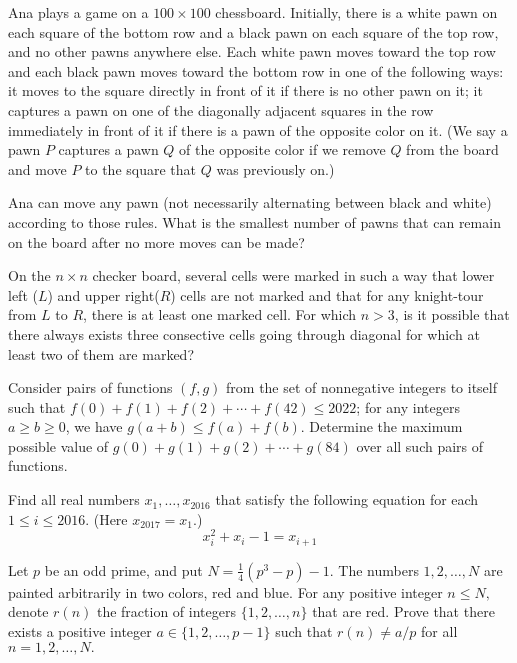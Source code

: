 \documentclass[11pt]{scrartcl}
\begin{document}
\begin{problem}[7205358409203299180]
	Ana plays a game on a $100\times 100$ chessboard. Initially, there is a white pawn on each square of the bottom row and a black pawn on each square of the top row, and no other pawns anywhere else.
Each white pawn moves toward the top row and each black pawn moves toward the bottom row in one of the following ways:
it moves to the square directly in front of it if there is no other pawn on it;
it captures a pawn on one of the diagonally adjacent squares in the row immediately in front of it if there is a pawn of the opposite color on it.
(We say a pawn $P$ captures a pawn $Q$ of the opposite color if we remove $Q$ from the board and move $P$ to the square that $Q$ was previously on.)

Ana can move any pawn (not necessarily alternating between black and white) according to those rules. What is the smallest number of pawns that can remain on the board after no more moves can be made?
\end{problem}
\begin{problem}[409149115429190]
	On the $n\times n$ checker board, several cells were marked in such a way that lower left ($L$) and upper right($R$) cells are not marked and that for any knight-tour from $L$ to $R$, there is at least one marked cell. For which $n>3$, is it possible that there always exists three consective cells going through diagonal for which at least two of them are marked?
\end{problem}
\begin{problem}[20663652231924]
Consider pairs of functions $(f, g)$ from the set of nonnegative integers to itself such that
$f(0) + f(1) + f(2) + \cdots + f(42) \le 2022$;
for any integers $a \ge b \ge 0$, we have $g(a+b) \le f(a) + f(b)$.
Determine the maximum possible value of $g(0) + g(1) + g(2) + \cdots + g(84)$ over all such pairs of functions.
\end{problem}
\begin{problem}[397912644922719]
Find all real numbers $x_1, \dots, x_{2016}$ that satisfy the following equation for each $1 \le i \le 2016$. (Here $x_{2017} = x_1$.)
\[ x_i^2 + x_i - 1 = x_{i+1} \]
\end{problem}
\begin{problem}[47893544380608]
	Let $p$ be an odd prime, and put $N=\frac{1}{4} (p^3 -p) -1.$ The numbers $1,2, \dots, N$ are painted arbitrarily in two colors, red and blue. For any positive integer $n \leqslant N,$ denote $r(n)$ the fraction of integers $\{ 1,2, \dots, n \}$ that are red.
Prove that there exists a positive integer $a \in \{ 1,2, \dots, p-1\}$ such that $r(n) \neq a/p$ for all $n = 1,2, \dots , N.$
\end{problem}
\end{document}
